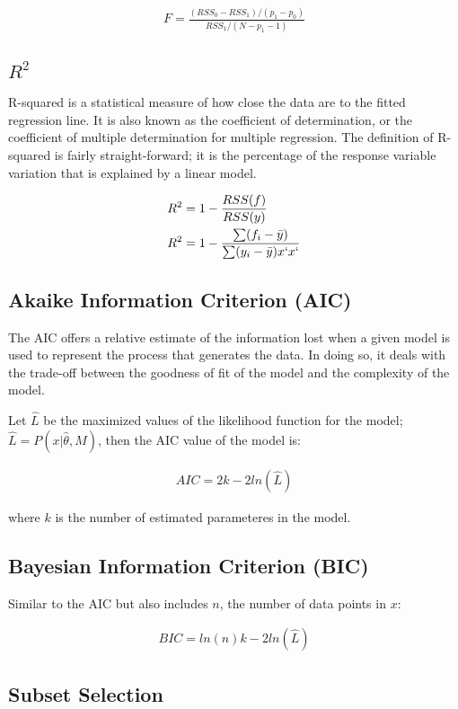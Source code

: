 \documentclass[12pt]{article}
\begin{document}
\begin{&itemize}
\begin{align*}
F = \frac{(RSS_0 - RSS_1)/(p_1 - p_0)}{RSS_1/(N-p_1 - 1)}
\end{align*}

\subsection{$R^2$}
R-squared is a statistical measure of how close the data are to the fitted regression line. It is also known as the coefficient of determination, or the coefficient of multiple determination for multiple regression. The definition of R-squared is fairly straight-forward; it is the percentage of the response variable variation that is explained by a linear model.

\begin{align*}
R^2 &= 1 - \frac{RSS(f)}{RSS(y)} \\
R^2 &= 1 - \frac{\sum (f_i - \bar{y})}{\sum (y_i - \bar{y})x`x`}
\end{align*}

\subsection{Akaike Information Criterion (AIC)}
The AIC offers a relative estimate of the information lost when a given model is used to represent the process that generates the data. In doing so, it deals with the trade-off between the goodness of fit of the model and the complexity of the model.

Let $\hat{L}$ be the maximized values of the likelihood function for the model; $\hat{L} = P(x|\hat{\theta},M)$, then the AIC value of the model is:

\begin{align*}
    AIC = 2k - 2ln(\hat{L})
\end{align*}

where $k$ is the number of estimated parameteres in the model.

\subsection{Bayesian Information Criterion (BIC)}
Similar to the AIC but also includes $n$, the number of data points in $x$:

\begin{align*}
    BIC = ln(n)k - 2ln(\hat{L})
\end{align*}

\subsection{Subset Selection}

\end{&itemize}
\end{document}
